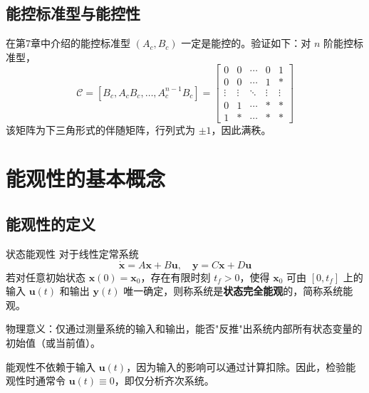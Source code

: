 \subsection{能控标准型与能控性}

在第7章中介绍的能控标准型 $(A_c, B_c)$ 一定是能控的。验证如下：对 $n$ 阶能控标准型，
\[
\mathcal{C} = [B_c, A_c B_c, \ldots, A_c^{n-1}B_c] = \begin{bmatrix}
0 & 0 & \cdots & 0 & 1 \\
0 & 0 & \cdots & 1 & * \\
\vdots & \vdots & \ddots & \vdots & \vdots \\
0 & 1 & \cdots & * & * \\
1 & * & \cdots & * & *
\end{bmatrix}
\]
该矩阵为下三角形式的伴随矩阵，行列式为 $\pm 1$，因此满秩。

\section{能观性的基本概念}

\subsection{能观性的定义}

\begin{mydefinition}{状态能观性}
对于线性定常系统
\[
\dot{\mathbf{x}} = A\mathbf{x} + B\mathbf{u},\quad \mathbf{y} = C\mathbf{x} + D\mathbf{u}
\]
若对任意初始状态 $\mathbf{x}(0) = \mathbf{x}_0$，存在有限时刻 $t_f > 0$，使得 $\mathbf{x}_0$ 可由 $[0, t_f]$ 上的输入 $\mathbf{u}(t)$ 和输出 $\mathbf{y}(t)$ 唯一确定，则称系统是\textbf{状态完全能观}的，简称系统能观。
\end{mydefinition}

物理意义：仅通过测量系统的输入和输出，能否"反推"出系统内部所有状态变量的初始值（或当前值）。

\begin{remark}
能观性不依赖于输入 $\mathbf{u}(t)$，因为输入的影响可以通过计算扣除。因此，检验能观性时通常令 $\mathbf{u}(t) \equiv 0$，即仅分析齐次系统。
\end{remark}

